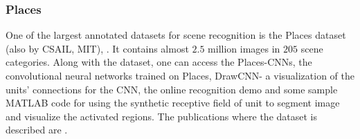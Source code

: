 \subsubsection{Places}\label{subsec:places}
One of the largest annotated datasets for scene recognition is the Places dataset (also by CSAIL, MIT), \cite{places_db}. It contains almost $2.5$ million images in $205$ scene categories. Along with the dataset, one can access the Places-CNNs, the convolutional neural networks trained on Places, DrawCNN- a visualization of the units' connections for the CNN, the online recognition demo and some sample MATLAB code for using the synthetic receptive field of unit to segment image and visualize the activated regions. The publications where the dataset is described are \cite{Zhou2014, Zhou2015}.